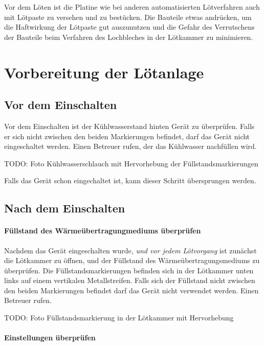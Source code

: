 \documentclass{\basedir/fablab-document}
\begin{document}
Vor dem L{\"o}ten ist die Platine wie bei anderen automatisierten L{\"o}tverfahren auch mit L{\"o}tpaste zu versehen und zu best{\"u}cken. Die Bauteile etwas andr{\"u}cken, um die Haftwirkung der L{\"o}tpaste gut auszunutzen und die Gefahr des Verrutschens der Bauteile beim Verfahren des Lochbleches in der L{\"o}tkammer zu minimieren.

\section{Vorbereitung der L{\"o}tanlage}
\subsection{Vor dem Einschalten}

Vor dem Einschalten ist der K{\"u}hlwasserstand hinten Ger{\"a}t zu {\"u}berpr{\"u}fen. Falls er sich nicht zwischen den beiden Markierungen befindet, darf das Ger{\"a}t nicht eingeschaltet werden. Einen Betreuer rufen, der das K{\"u}hlwasser nachf{\"u}llen wird.

TODO: Foto K{\"u}hlwasserschlauch mit Hervorhebung der F{\"u}llstandsmarkierungen

Falls das Ger{\"a}t schon eingechaltet ist, kann dieser Schritt {\"u}bersprungen werden.

\subsection{Nach dem Einschalten}

\paragraph{F{\"u}llstand des W{\"a}rme{\"u}bertragungmediums {\"u}berpr{\"u}fen}

Nachdem das Ger{\"a}t eingeschalten wurde, \textit{und vor jedem L{\"o}tvorgang} ist zun{\"a}chst die L{\"o}tkammer zu {\"o}ffnen, und der F{\"u}llstand des W{\"a}rme{\"u}bertragungsmediums zu {\"u}berpr{\"u}fen. Die F{\"u}llstandsmarkierungen befinden sich in der L{\"o}tkammer unten links auf einem vertikalen Metallstreifen. Falls sich der F{\"u}llstand nicht zwischen den beiden Markierungen befindet darf das Ger{\"a}t nicht verwendet werden. Einen Betreuer rufen.

TODO: Foto F{\"u}llstandsmarkierung in der L{\"o}tkammer mit Hervorhebung

\paragraph{Einstellungen {\"u}berpr{\"u}fen}
\end{document}
